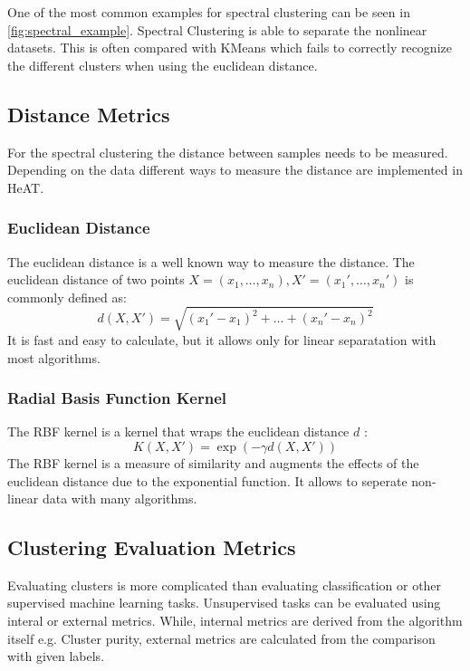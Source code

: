 One of the most common examples for spectral clustering can be seen in \cref{fig:spectral_example}. Spectral Clustering is able to
separate the nonlinear datasets. This is often compared with KMeans which fails to correctly recognize the different clusters when using the euclidean distance.

\subsection{Distance Metrics}
\label{subsec:distance_metrics}
For the spectral clustering the distance between samples needs to be measured. Depending on the data different ways to measure the distance are implemented in \gls{HeAT}.

\subsubsection{Euclidean Distance}
The euclidean distance is a well known way to measure the distance. The euclidean distance of two points \(X = (x_1, \ldots, x_n ), X' = (x_1', \ldots, x_n')\) is commonly defined  as:
\[
  d\left(X, X'\right) = \sqrt{{(x_1' - x_1)}^2 + \ldots + {(x_n' - x_n)}^2}
\]
It is fast and easy to calculate, but it allows only for linear separatation with most algorithms.

\subsubsection{Radial Basis Function Kernel}
The RBF kernel is a kernel that wraps the euclidean distance \(d\) \cite{vert_primer_2004}:
\[
  K\left(X, X'\right) = \exp(-\gamma d(X, X'))
\]
The RBF kernel is a measure of similarity and augments the effects of the euclidean distance due to the exponential function.
It allows to seperate non-linear data with many algorithms.


\subsection{Clustering Evaluation Metrics}
\label{subsec:clustering_evaluation_metrics}

Evaluating clusters is more complicated than evaluating classification or other supervised machine learning tasks.
Unsupervised tasks can be evaluated using interal or external metrics. While, internal metrics are derived from the algorithm itself e.g. Cluster purity, external metrics are calculated from the comparison with given labels.

